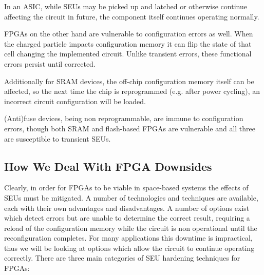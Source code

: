 \documentclass[12pt,final,oneside]{dwThesis} %
\begin{document}
   In an \gls{ASIC}, while \glspl{SEU} may be picked up and latched or
   otherwise continue affecting the circuit in future, the component itself
   continues operating normally.

   \glspl{FPGA} on the other hand are vulnerable to configuration errors as
   well. When the charged particle impacts configuration memory it can flip the
   state of that cell changing the implemented circuit. Unlike transient
   errors, these functional errors persist until corrected.

   Additionally for \gls{SRAM} devices, the off-chip configuration memory
   itself can be affected, so the next time the chip is reprogrammed (e.g.
   after power cycling), an incorrect circuit configuration will be loaded.

   (Anti)fuse devices, being non reprogrammable, are immune to configuration
   errors, though both \gls{SRAM} and flash-based \glspl{FPGA} are vulnerable
   and all three are susceptible to transient \glspl{SEU}\cite{HFPP}.


   \subsection{How We Deal With \gls{FPGA}
      Downsides} Clearly, in order for
   \glspl{FPGA} to be viable in space-based systems the effects of \glspl{SEU}
   must be mitigated. A number of technologies and techniques are available,
   each with their own advantages and disadvantages. A number of options exist
   which detect errors but are unable to determine the correct result,
   requiring a reload of the configuration memory while the circuit is non
   operational until the reconfiguration completes. For many applications this
   downtime is impractical, thus we will be looking at options which allow the
   circuit to continue operating correctly.  There are three main categories of
   \gls{SEU} hardening techniques for \glspl{FPGA}\cite{HardeningTechniques}:
\end{document}
